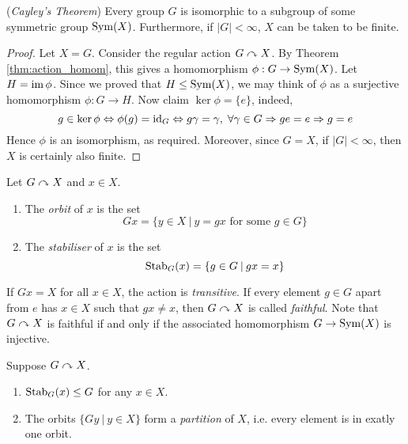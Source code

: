 \documentclass[10pt, a4paper, twoside]{report}
\begin{document}
\begin{theorem}
    (\emph{Cayley's Theorem}) Every group \(G\) is isomorphic to a subgroup of some symmetric group \(\operatorname{Sym}(X)\). Furthermore, if \(|G|<\infty\), \(X\) can be taken to be finite.
\end{theorem}
\begin{proof}
    Let \(X=G\). Consider the regular action \(G\curvearrowright X\). By Theorem \ref{thm:action_homom}, this gives a homomorphism \(\phi:G\to\operatorname{Sym}(X)\). Let \(H=\operatorname{im}\phi\). Since we proved that \(H\leq\operatorname{Sym}(X)\), we may think of \(\phi\) as a surjective homomorphism \(\phi:G\to H\). Now claim \(\ker\phi=\{e\}\), indeed,
    \[g\in\ker\phi\Leftrightarrow\phi(g)=\operatorname{id}_G\Leftrightarrow g\gamma=\gamma,\;\forall\gamma\in G\Rightarrow ge=e\Rightarrow g=e\]
    Hence \(\phi\) is an isomorphism, as required. Moreover, since \(G=X\), if \(|G|<\infty\), then \(X\) is certainly also finite.
\end{proof}
\begin{definition}
    Let \(G\curvearrowright X\) and \(x\in X\).
    \begin{enumerate}
        \item The \emph{orbit} of \(x\) is the set 
        \[Gx=\{y\in X\:|\:y=gx\text{  for some \(g\in G\)}\}\]
        \item The \emph{stabiliser} of \(x\) is the set
        \[\operatorname{Stab}_G(x)=\{g\in G\:|\:gx=x\}\]
    \end{enumerate}
\end{definition}
If \(Gx=X\) for all \(x\in X\), the action is \emph{transitive}. If every element \(g\in G\) apart from \(e\) has \(x\in X\) such that \(gx\neq x\), then \(G\curvearrowright X\) is called \emph{faithful}. Note that \(G\curvearrowright X\) is faithful if and only if the associated homomorphism \(G\to\operatorname{Sym}(X)\) is injective.
\begin{proposition}
    Suppose \(G\curvearrowright X\).
    \begin{enumerate}
        \item \(\operatorname{Stab}_G(x)\leq G\) for any \(x\in X\).
        \item The orbits \(\{Gy\:|\:y\in X\}\) form a \emph{partition} of \(X\), i.e. every element is in exatly one orbit.
    \end{enumerate}
\end{proposition}
\end{document}
